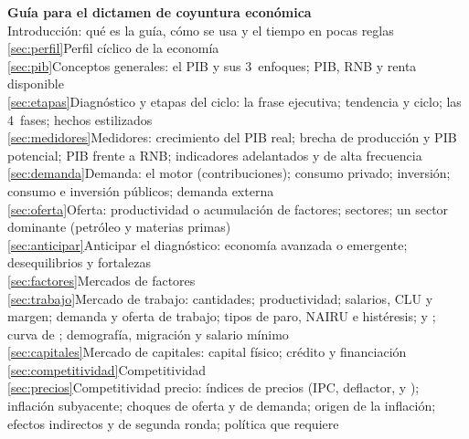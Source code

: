 \documentclass[11pt]{article}
\begin{document}
\begin{esquema}[title={Esquema de la guía},fontupper=\footnotesize]
\textbf{Guía para el dictamen de coyuntura económica}\\[2pt]
Introducción: qué es la guía, cómo se usa y el tiempo en pocas reglas\\
\ref{sec:perfil}\enspace Perfil cíclico de la economía\\
\hspace*{1.5em}\ref{sec:pib}\enspace Conceptos generales: el PIB y sus 3~enfoques; PIB, RNB y renta disponible\\
\hspace*{1.5em}\ref{sec:etapas}\enspace Diagnóstico y etapas del ciclo: la frase ejecutiva; tendencia y ciclo; las 4~fases; hechos estilizados\\
\hspace*{1.5em}\ref{sec:medidores}\enspace Medidores: crecimiento del PIB real; brecha de producción y PIB potencial; PIB frente a RNB; indicadores adelantados y de alta frecuencia\\
\hspace*{1.5em}\ref{sec:demanda}\enspace Demanda: el motor (contribuciones); consumo privado; inversión; consumo e inversión públicos; demanda externa\\
\hspace*{1.5em}\ref{sec:oferta}\enspace Oferta: productividad o acumulación de factores; sectores; un sector dominante (petróleo y materias primas)\\
\hspace*{1.5em}\ref{sec:anticipar}\enspace Anticipar el diagnóstico: economía avanzada o emergente; desequilibrios y fortalezas\\
\ref{sec:factores}\enspace Mercados de factores\\
\hspace*{1.5em}\ref{sec:trabajo}\enspace Mercado de trabajo: cantidades; productividad; salarios, CLU y margen; demanda y oferta de trabajo; tipos de paro, NAIRU e histéresis;  y ; curva de ; demografía, migración y salario mínimo\\
\hspace*{1.5em}\ref{sec:capitales}\enspace Mercado de capitales: capital físico; crédito y financiación\\
\ref{sec:competitividad}\enspace Competitividad\\
\hspace*{1.5em}\ref{sec:precios}\enspace Competitividad precio: índices de precios (IPC, deflactor,  y ); inflación subyacente; choques de oferta y de demanda; origen de la inflación; efectos indirectos y de segunda ronda; política que requiere\\

\end{esquema}
\end{document}
